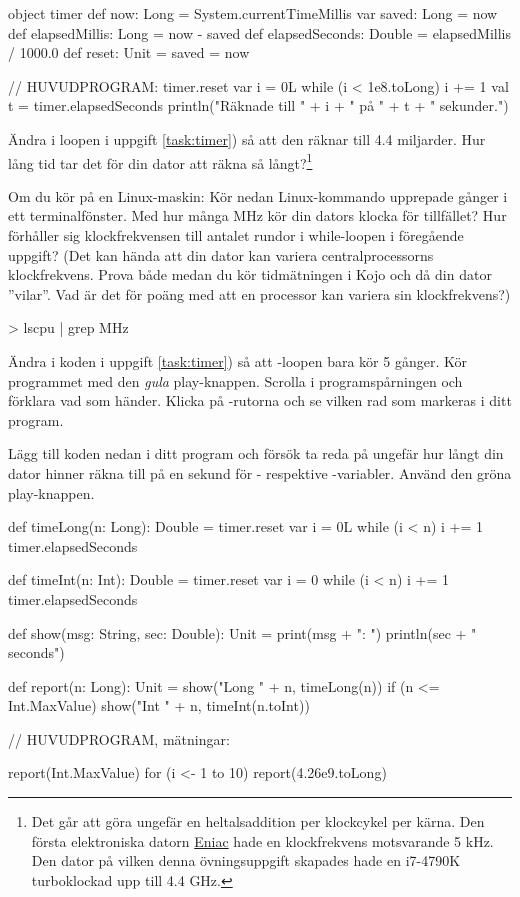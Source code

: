 \begin{Code}
object timer {
  def now: Long = System.currentTimeMillis
  var saved: Long = now
  def elapsedMillis: Long = now - saved
  def elapsedSeconds: Double = elapsedMillis / 1000.0
  def reset: Unit = { saved = now }
}

// HUVUDPROGRAM:
timer.reset
var i = 0L
while (i < 1e8.toLong) { i += 1 }
val t = timer.elapsedSeconds
println("Räknade till " + i + " på " + t + " sekunder.")
\end{Code}


\Subtask Ändra i loopen i uppgift \ref{task:timer}) så att den räknar till 4.4 miljarder. Hur lång tid tar det för din dator att räkna så långt?\footnote{Det går att göra ungefär en heltalsaddition per klockcykel per kärna. Den första elektroniska datorn \href{https://sv.wikipedia.org/wiki/ENIAC}{Eniac} hade en klockfrekvens motsvarande 5 kHz. Den dator på vilken denna övningsuppgift skapades hade en i7-4790K turboklockad upp till 4.4 GHz.
}

\Subtask  Om du kör på en Linux-maskin: Kör nedan Linux-kommando upprepade gånger i ett terminalfönster. Med hur många MHz kör din dators klocka för tillfället? Hur förhåller sig klockfrekvensen till antalet rundor i while-loopen i föregående uppgift? (Det kan hända att din dator kan variera centralprocessorns klockfrekvens. Prova både medan du kör tidmätningen i Kojo och då din dator ''vilar''. Vad är det för poäng med att en processor kan variera sin klockfrekvens?)
\begin{REPLnonum}
> lscpu | grep MHz
\end{REPLnonum}


\Subtask Ändra i koden i uppgift \ref{task:timer}) så att -loopen bara kör 5 gånger. Kör programmet med den \emph{gula} play-knappen. Scrolla i programspårningen och förklara vad som händer. Klicka på -rutorna och se vilken rad som markeras i ditt program.

\Subtask Lägg till koden nedan i ditt program och försök ta reda på ungefär hur långt din dator hinner räkna till på en sekund för - respektive -variabler. Använd den gröna play-knappen.
\begin{Code}
def timeLong(n: Long): Double = {
  timer.reset
  var i = 0L
  while (i < n) { i += 1 }
  timer.elapsedSeconds
}

def timeInt(n: Int): Double = {
  timer.reset
  var i = 0
  while (i < n) { i += 1 }
  timer.elapsedSeconds
}

def show(msg: String, sec: Double): Unit = {
  print(msg + ": ")
  println(sec + " seconds")
}

def report(n: Long): Unit = {
  show("Long " + n, timeLong(n))
  if (n <= Int.MaxValue) show("Int  " + n, timeInt(n.toInt))
}

// HUVUDPROGRAM, mätningar:

report(Int.MaxValue)
for (i <- 1 to 10) report(4.26e9.toLong)
\end{Code}

